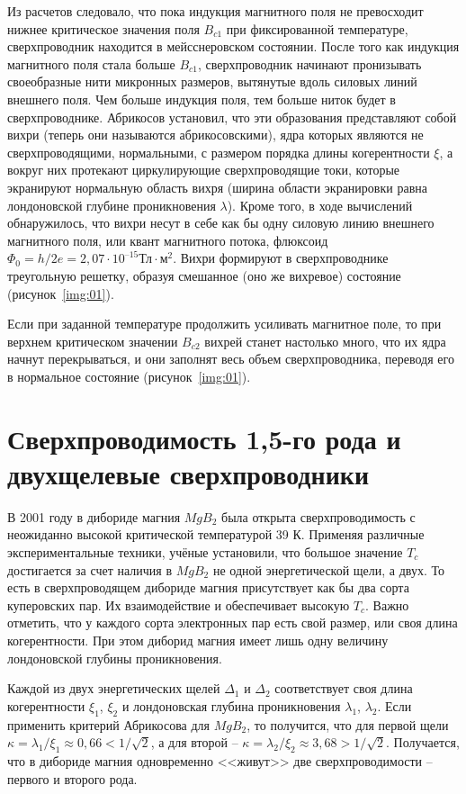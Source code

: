 Из расчетов следовало, что пока индукция магнитного поля не превосходит нижнее 
критическое значения поля \( B_{c1} \) при фиксированной температуре, 
сверхпроводник находится в мейсснеровском состоянии. После того как индукция 
магнитного поля стала больше \( B_{c1} \), сверхпроводник начинают пронизывать 
своеобразные нити микронных размеров, вытянутые вдоль силовых линий внешнего 
поля. Чем больше индукция поля, тем больше ниток будет в сверхпроводнике. 
Абрикосов установил, что эти образования представляют собой вихри (теперь они 
называются абрикосовскими), ядра которых являются не сверхпроводящими, 
нормальными, с размером порядка длины когерентности \( \xi \), а вокруг них 
протекают циркулирующие сверхпроводящие токи, которые экранируют нормальную 
область вихря (ширина области экранировки равна лондоновской глубине 
проникновения \( \lambda \)). Кроме того, в ходе вычислений обнаружилось, что 
вихри несут в себе как бы одну силовую линию внешнего магнитного поля, или 
квант магнитного потока, флюксоид 
\( \Phi_0 = h/2e = 2,07\cdot10^{–15} \text{Тл}\cdot{м}^2 \). Вихри формируют в 
сверхпроводнике треугольную решетку, образуя смешанное (оно же вихревое) 
состояние (рисунок~\ref{img:01}).

Если при заданной температуре продолжить усиливать магнитное поле, то при 
верхнем критическом значении \( B_{c2} \) вихрей станет настолько много, что 
их ядра начнут перекрываться, и они заполнят весь объем сверхпроводника, 
переводя его в нормальное состояние (рисунок~\ref{img:01}). \cite{bib:net}

\section{Сверхпроводимость 1,5-го рода и двухщелевые сверхпроводники}
В 2001 году в дибориде магния \( MgB_2 \) была открыта сверхпроводимость с 
неожиданно высокой критической температурой 39 К. Применяя различные 
экспериментальные техники, учёные установили, что большое значение \( T_c \) 
достигается за счет наличия в \( MgB_2 \) не одной энергетической щели, а 
двух. То есть в сверхпроводящем дибориде магния присутствует как бы два сорта 
куперовских пар. Их взаимодействие и обеспечивает высокую \( T_c \). Важно 
отметить, что у каждого сорта электронных пар есть свой размер, или своя длина 
когерентности. При этом диборид магния имеет лишь одну величину лондоновской 
глубины проникновения. \cite{bib:net}

Каждой из двух энергетических щелей \( \Delta_1 \) и \( \Delta_2 \) 
соответствует своя длина когерентности \( \xi_1 \), \( \xi_2 \) и лондоновская 
глубина проникновения \( \lambda_1 \), \( \lambda_2 \). Если применить 
критерий Абрикосова для \( MgB_2 \), то получится, что для первой щели 
\( \kappa = \lambda_1 / \xi_1 \approx 0,66 < 1/\sqrt{2} \), а для второй -- 
\( \kappa = \lambda_2 / \xi_2 \approx 3,68 > 1/\sqrt{2} \). Получается, что в 
дибориде магния одновременно <<живут>> две сверхпроводимости -- первого и 
второго рода.

